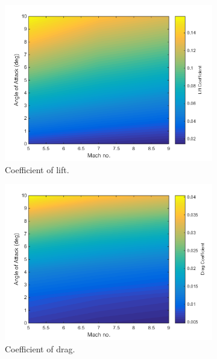 		
		\begin{figure}
			\begin{subfigure}{.5\textwidth}
				\centering
				\includegraphics[width=0.99\linewidth]{figures/3_vehicle_design/Cl-EngineOn}
				\caption{Coefficient of lift.}
				\label{fig:Cl-EngineOn}
			\end{subfigure}
			\begin{subfigure}{.5\textwidth}
				\centering
				\includegraphics[width=0.99\linewidth]{figures/3_vehicle_design/Cd-EngineOn}
				\caption{Coefficient of drag.}
				\label{fig:Cd-EngineOn}
			\end{subfigure}
			\begin{subfigure}{.5\textwidth}
				\centering

\end{subfigure}
\end{figure}
